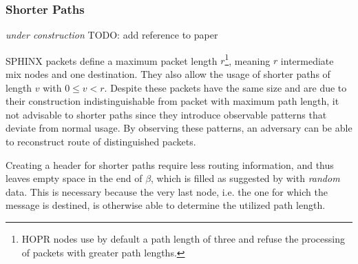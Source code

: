 \subsubsection{Shorter Paths}
\label{sec:sphinx:shorterpaths}

\textit{under construction} TODO: add reference to paper

SPHINX packets define a maximum packet length $r$\footnote{HOPR nodes use by default a path length of three and refuse the processing of packets with greater path lengths.}, meaning $r$ intermediate mix nodes and one destination. They also allow the usage of shorter paths of length $v$ with $0 \le v < r$. Despite these packets have the same size and are due to their construction indistinguishable from packet with maximum path length, it not advisable to shorter paths since they introduce observable patterns that deviate from normal usage. By observing these patterns, an adversary can be able to reconstruct route of distinguished packets.

Creating a header for shorter paths require less routing information, and thus leaves empty space in the end of $\beta$, which is filled as suggested by \cite{sphinxpaperfix} with \textit{random} data. This is necessary because the very last node, i.e. the one for which the message is destined, is otherwise able to determine the utilized path length.

